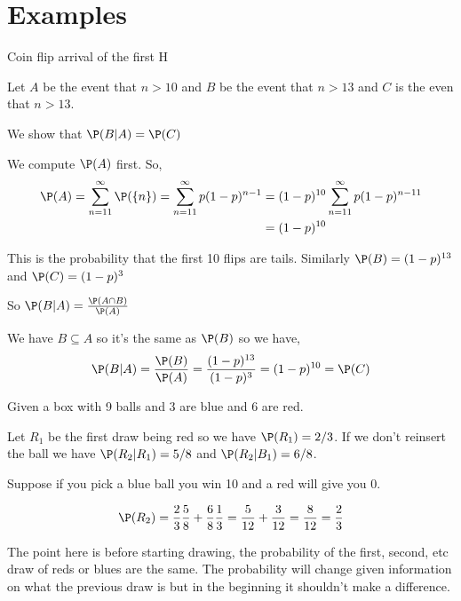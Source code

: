 \section{Examples}
\begin{eg}
    Coin flip arrival of the first H


    Let $A$ be the event that $n > 10$ and  $B$ be the event that $n > 13$ and $C$ is the even that $n > 13$.


    We show that $\P(B | A) = \P(C)$


    We compute $\P(A)$ first.  So, 
    \begin{align*}
        \P(A) = \sum_{n = 11}^{\infty} \P(\{n\}) = \sum_{n = 11}^{\infty} p(1 - p)^{n - 1} &= (1 - p)^{10} \sum_{n = 11}^{\infty} p (1 - p)^{n - 11} \\
        &= (1 - p)^{10}
    \end{align*}

    This is the probability that the first 10 flips are tails.  Similarly $\P(B) = (1 - p)^{13}$ and $\P(C) = (1 -p)^{3}$

    So $\P(B | A) = \frac{\P(A \cap B)}{\P(A)}$

    We have $B \subseteq A$ so it's the same as  $\P(B)$ so we have,  
    $$ \P(B | A) =\frac{ \P(B)}{\P(A)} = \frac{(1 - p)^{13}}{(1 - p)^{3}} = (1 - p)^{10} = \P(C) $$ 
\end{eg}


\begin{eg}
    Given a box with 9 balls and 3 are blue and 6 are red.


    Let $R_1$ be the first draw being red so we have $\P(R_1) = 2 /3$. If we don't reinsert the ball we have $\P(R_2 | R_1) = 5 /8$ and $\P(R_2 | B_1) = 6 / 8$.


    \vspace{em}

    Suppose if you pick a blue ball you win 10 and a red will give you 0.

    $$\P(R_2) = \frac{2}{3} \frac{5}{8} + \frac{6}{8}  \frac{1}{3} = \frac{5}{12} + \frac{3}{12} = \frac{8}{12} = \frac{2}{3}$$
\end{eg} 
\begin{remark}
    The point here is before starting drawing, the probability of the first, second, etc draw of reds or blues are the same. The probability will change given information on what the previous draw is but in the beginning it shouldn't make a difference.
\end{remark}


